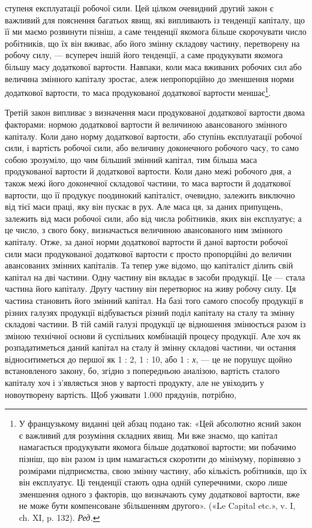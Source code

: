 \parcont{}  %
ступеня експлуатації робочої сили. Цей цілком очевидний другий
закон є важливий для пояснення багатьох явищ, які випливають
із тенденції капіталу, що її ми маємо розвинути пізніш,
а саме тенденції якомога більше скорочувати число робітників,
що їх він вживає, або його змінну складову частину, перетворену
на робочу силу, — всупереч іншій його тенденції, а саме продукувати
якомога більшу масу додаткової вартости. Навпаки, коли
маса вживаних робочих сил або величина змінного капіталу
зростає, алеж непропорційно до зменшення норми додаткової
вартости, то маса продукованої додаткової вартости меншає\footnote*{
У французькому виданні цей абзац подано так: «Цей абсолютно
ясний закон є важливий для розуміння складних явищ. Ми вже знаємо,
що капітал намагається продукувати якомога більше додаткової вартости;
ми побачимо пізніш, що він разом із цим намагається скоротити до
мінімуму, порівняно з розмірами підприємства, свою змінну частину,
або кількість робітників, що їх він експлуатує. Ці тенденції стають одна
одній суперечними, скоро лише зменшення одного з факторів, що визначають
суму додаткової вартости, вже не може бути компенсоване збільшенням
другого». («Le Capital etc.», v. I, ch. XI, p. 132). \emph{Ред.}
}.

Третій закон випливає з визначення маси продукованої додаткової
вартости двома факторами: нормою додаткової вартости й
величиною авансованого змінного капіталу. Коли дано норму
додаткової вартости, або ступінь експлуатації робочої сили,
і вартість робочої сили, або величину доконечного робочого
часу, то само собою зрозуміло, що чим більший змінний капітал,
тим більша маса продукованої вартости й додаткової вартости.
Коли дано межі робочого дня, а також межі його доконечної
складової частини, то маса вартости й додаткової вартости,
що її продукує поодинокий капіталіст, очевидно, залежить
виключно від тієї маси праці, яку він пускає в рух. Але
маса ця, за даних припущень, залежить від маси робочої сили,
або від числа робітників, яких він експлуатує; а це число, з
свого боку, визначається величиною авансованого ним змінного
капіталу. Отже, за даної норми додаткової вартости й даної вартости
робочої сили маси продукованої додаткової вартости є
просто пропорційні до величин авансованих змінних капіталів.
Та тепер уже відомо, що капіталіст ділить свій капітал на
дві частини. Одну частину він вкладає в засоби продукції. Це —
стала частина його капіталу. Другу частину він перетворює на
живу робочу силу. Ця частина становить його змінний капітал.
На базі того самого способу продукції в різних галузях продукції
відбувається різний поділ капіталу на сталу та змінну складові
частини. В тій самій галузі продукції це відношення змінюється
разом із зміною технічної основи й суспільних комбінацій процесу
продукції. Але хоч як розпадатиметься даний капітал на сталу
й змінну складові частини, чи остання відноситиметься до першої
як 1 : 2, 1 : 10, або 1 : \emph{х}, — це не порушує щойно встановленого
закону, бо, згідно з попередньою аналізою, вартість сталого капіталу
хоч і з’являється знов у вартості продукту, але не увіходить
у новоутворену вартість. Щоб уживати \num{1.000} прядунів, потрібно,
\parbreak{}  %
